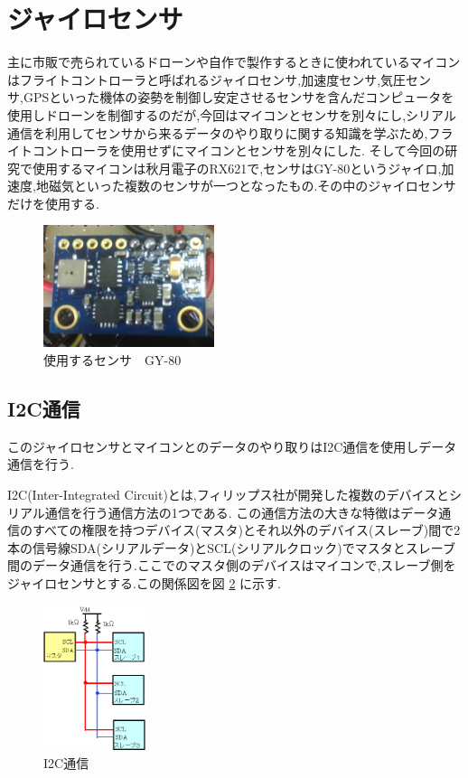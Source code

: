 \documentclass[twocolumn,11pt]{abst}
\begin{document}
\section{ジャイロセンサ}
主に市販で売られているドローンや自作で製作するときに使われているマイコンはフライトコントローラと呼ばれるジャイロセンサ,加速度センサ,気圧センサ,GPSといった機体の姿勢を制御し安定させるセンサを含んだコンピュータを使用しドローンを制御するのだが,今回はマイコンとセンサを別々にし,シリアル通信を利用してセンサから来るデータのやり取りに関する知識を学ぶため,フライトコントローラを使用せずにマイコンとセンサを別々にした.
そして今回の研究で使用するマイコンは秋月電子のRX621で,センサはGY-80というジャイロ,加速度,地磁気といった複数のセンサが一つとなったもの.その中のジャイロセンサだけを使用する.

\begin{figure}[htbp]
  \begin{center}
    \includegraphics[width=50mm]{GY-80.jpg}
    \end{center}
  \caption{使用するセンサ　GY-80}
 \label{fig:GY-80}
\end{figure}


\subsection{I2C通信}
このジャイロセンサとマイコンとのデータのやり取りはI2C通信を使用しデータ通信を行う.

I2C(Inter-Integrated Circuit)とは,フィリップス社が開発した複数のデバイスとシリアル通信を行う通信方法の1つである.
この通信方法の大きな特徴はデータ通信のすべての権限を持つデバイス(マスタ)とそれ以外のデバイス(スレーブ)間で2本の信号線SDA(シリアルデータ)とSCL(シリアルクロック)でマスタとスレーブ間のデータ通信を行う.ここでのマスタ側のデバイスはマイコンで,スレーブ側をジャイロセンサとする.この関係図を図 \ref{fig:i2c} に示す.

\begin{figure}[htbp]
  \begin{center}
    \includegraphics[width=30mm]{i2c.png}
    \end{center}
  \caption{I2C通信}
 \label{fig:i2c}
\end{figure}
\end{document}
